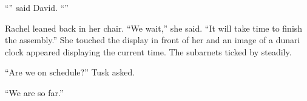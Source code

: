 ``'' said David. ``''

Rachel leaned back in her chair. ``We wait,'' she said. ``It will take time to finish the
assembly.'' She touched the display in front of her and an image of a dunari clock appeared
displaying the current time. The subarnets ticked by steadily.

``Are we on schedule?'' Tusk asked.

``We are so far.''

\breakpoint


